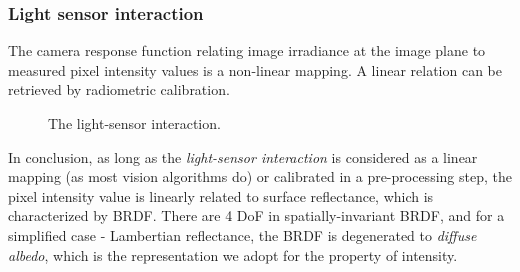 \subsubsection{Light sensor interaction}
The camera response function relating image irradiance at the image plane to measured pixel intensity values is a non-linear mapping. A linear relation can be retrieved by radiometric calibration.
\begin{figure}[!ht]
\centering
{}
\caption{The light-sensor interaction.}
\label{fig:light_sensor_interact}
\end{figure}

In conclusion, as long as the \textit{light-sensor interaction} is considered as a linear mapping (as most vision algorithms do) or calibrated in a pre-processing step, the pixel intensity value is linearly related to surface reflectance, which is characterized by BRDF. There are 4 DoF in spatially-invariant BRDF, and for a simplified case - Lambertian reflectance, the BRDF is degenerated to \textit{diffuse albedo}, which is the representation we adopt for the property of intensity.


